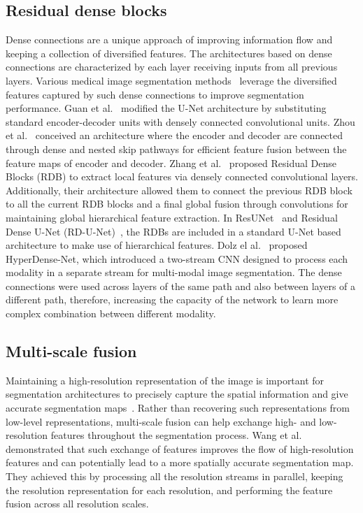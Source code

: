 \documentclass[journal,twoside,web]{IEEEtran}
\begin{document}
\subsection{Residual dense blocks}
Dense connections are a unique approach of improving information flow and keeping a collection of diversified features.
The architectures based on dense connections are characterized by each layer receiving inputs from all previous layers.
Various medical image segmentation methods~\cite{guan2019fully,zhou2019unet++,zhang2018residual,yang2019road,ding2019deep} leverage the diversified features captured by such dense connections to improve segmentation performance. Guan et al.~\cite{guan2019fully} modified the U-Net architecture by substituting standard encoder-decoder units with densely connected convolutional units. Zhou et al.~\cite{zhou2019unet++} conceived an architecture where the encoder and decoder are connected through dense and nested skip pathways for efficient feature fusion between the feature maps of encoder and decoder. Zhang et al.~\cite{zhang2018residual} proposed Residual Dense Blocks (RDB) to extract local features via densely connected convolutional layers. Additionally, their architecture allowed them to connect the previous RDB block to all the current RDB blocks and a final global fusion through  convolutions for maintaining global hierarchical feature extraction. In ResUNet~\cite{yang2019road} and Residual Dense U-Net (RD-U-Net)~\cite{ding2019deep}, the RDBs are included in a standard U-Net based architecture to make use of hierarchical features. Dolz el al.~\cite{dolz2018hyperdense} proposed HyperDense-Net, which introduced a two-stream \ac{CNN} designed to process each modality in a separate stream for multi-modal image segmentation. The dense connections were used across layers of the same path and also between layers of a different path, therefore, increasing the capacity of the network to learn more complex combination between different modality.

\subsection{Multi-scale fusion}
Maintaining a high-resolution representation of the image is important for segmentation architectures to precisely capture the spatial information and give accurate segmentation maps~\cite{Wang_2020}.
Rather than recovering such representations from low-level representations, multi-scale fusion can help exchange high- and low-resolution features throughout the segmentation process. Wang et al.~\cite{Wang_2020} demonstrated that such exchange of features improves the flow of high-resolution features and can potentially lead to a more spatially accurate segmentation map. They achieved this by processing all the resolution streams in parallel, keeping the resolution representation for each resolution, and performing the feature fusion across all resolution scales.
\end{document}
